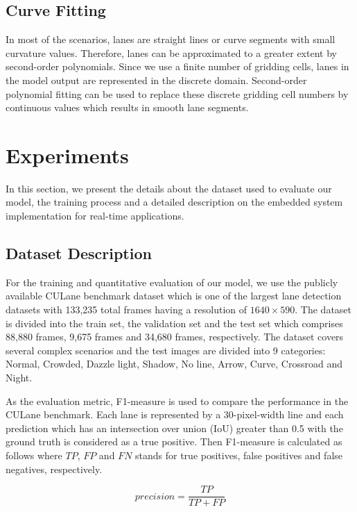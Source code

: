 \documentclass[conference]{IEEEtran}
\begin{document}
\subsection{Curve Fitting}
\label{ssec:LSQLF}
In most of the scenarios, lanes are straight lines or curve segments with small curvature values. Therefore, lanes can be approximated to a greater extent by second-order polynomials. Since we use a finite number of gridding cells, lanes in the model output are represented in the discrete domain. Second-order polynomial fitting can be used to replace these discrete gridding cell numbers by continuous values which results in smooth lane segments.

\section{Experiments}
\label{sec:Experiments}
In this section, we present the details about the dataset used to evaluate our model, the training process and a detailed description on the embedded system implementation for real-time applications.

\subsection{Dataset Description}
\label{ssec:datasets}

For the training and quantitative evaluation of our model, we use the publicly available CULane \cite{pan2018SCNN} benchmark dataset which is one of the largest lane detection datasets with 133,235 total frames having a resolution of $1640 \times 590$. The dataset is divided into the train set, the validation set and the test set which comprises 88,880 frames, 9,675 frames and 34,680 frames, respectively. The dataset covers several complex scenarios and the test images are divided into 9 categories: Normal, Crowded, Dazzle light, Shadow, No line, Arrow, Curve, Crossroad and Night. 

As the evaluation metric, F1-measure is used to compare the performance in the CULane benchmark. Each lane is represented by a 30-pixel-width line and each prediction which has an intersection over union (IoU) greater than 0.5 with the ground truth is considered as a true positive. Then F1-measure is calculated as follows where $TP$, $FP$ and $FN$ stands for true positives, false positives and false negatives, respectively.

\begin{equation}
precision = \frac{TP}{TP+FP}
\end{equation}
\end{document}
